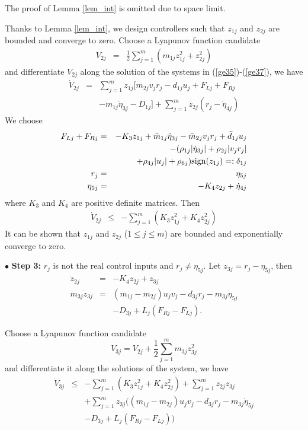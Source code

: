 \documentclass[letterpaper, 10 pt, conference]{ieeeconf}  %
\begin{document}
The proof of Lemma \ref{lem_int} is omitted due to space limit.

Thanks to Lemma \ref{lem_int}, we design controllers such that
$z_{1j}$ and $z_{2j}$ are bounded and converge to zero.
Choose a Lyapunov function candidate
\begin{eqnarray*}
V_{2j}&=&\frac{1}{2}\sum^m_{j=1}(m_{1j}{z}_{1j}^2+{z}_{2j}^2)
\end{eqnarray*}
and differentiate $V_{2j}$ along the solution of the systems in
(\ref{ge35})-(\ref{ge37}), we have
\begin{eqnarray*}
\dot{V}_{2j}&=&\sum^m_{j=1}{z}_{1j}[m_{2j}v_jr_j-d_{1j}u_j+F_{Lj}+F_{Rj}\\
&&
-m_{1j}\dot{{\eta}}_{3j}-D_{1j}]+\sum^m_{j=1}z_{2j}(r_j-\dot{\eta}_{4j})
\end{eqnarray*}
We choose
\begin{eqnarray}
F_{Lj}+F_{Rj}&=&-K_{3}z_{1j}+\bar{m}_{1j}\dot{{\eta}}_{3j}-\bar{m}_{2j}v_jr_j+\bar{d}_{1j}u_j\nonumber\\
&&-(\rho_{1j}|\dot{{\eta}}_{3j}|+\rho_{2j}|v_jr_j|\nonumber\\
&&+\rho_{4j}|u_j|+\rho_{6j}){\rm sign}(z_{1j})
=:\delta_{1j}\label{gcontrol1}\\
r_j&=&\eta_{5j}\\
\eta_{5j}&=&-K_4z_{2j}+\dot{\eta}_{4j}\label{geta5j}
\end{eqnarray}
where $K_{3}$ and $K_{4}$ are positive definite matrices.
 Then
\begin{eqnarray*}
\dot{V}_{2j}
&\leq & -\sum^m_{j=1}(K_{3}z^2_{1j}+K_{4}z^2_{2j})
\end{eqnarray*}
It can be shown
that  $z_{1j}$ and $z_{2j}$ ($1\leq j\leq m$) are bounded and
exponentially converge to zero.


$\bullet$ {\bf Step 3:} $r_j$ is not the real control inputs and
$r_j\not=\eta_{5j}$. Let
$z_{3j}=r_j-\eta_{5j}$,
then
\begin{eqnarray}
\dot{z}_{2j}&=&-K_4z_{2j}+z_{3j}\label{ge36qd}\\
m_{3j}\dot{z}_{3j}&=&(m_{1j}-m_{2j})u_jv_j-d_{3j}r_j-m_{3j}\dot{\eta}_{5j}\nonumber\\
&&-D_{3j}+L_j(F_{Rj}-F_{Lj}). \label{ge37d}
\end{eqnarray}

Choose a Lyapunov function candidate
$$V_{3j}=V_{2j}+\frac{1}{2}\sum^m_{j=1}m_{3j}z^2_{3j}$$
and differentiate it along the solutions of the system, we have
\begin{eqnarray*}
\dot{V}_{3j}&\leq & -\sum^m_{j=1}(K_{3}z^2_{1j}+K_{4}z^2_{2j})+\sum^m_{j=1}z_{2j}z_{3j}\\
&&+\sum^m_{j=1}z_{3j}((m_{1j}-m_{2j})u_jv_j-d_{3j}r_j-m_{3j}\dot{\eta}_{5j}\nonumber\\
&&-D_{3j}+L_j(F_{Rj}-F_{Lj}))
\end{eqnarray*}
\end{document}
